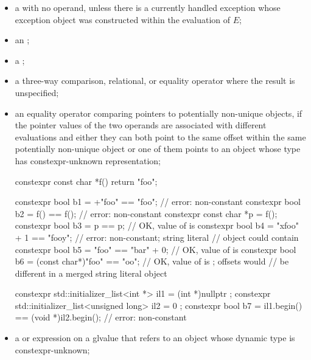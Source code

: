 \begin{itemize}
\item
a  with no operand,
unless there is a currently handled exception
whose exception object was constructed within the evaluation of $E$;

\item
an ;

\item
a ;

\item
a three-way comparison,
relational, or equality
operator where the result is unspecified;

\item
an equality operator comparing pointers to potentially non-unique objects,
if the pointer values of the two operands
are associated with different evaluations and either
they can both point to the same offset within
the same potentially non-unique object or
one of them points to an object whose
type has constexpr-unknown representation;
\begin{example}
\begin{codeblock}
constexpr const char *f() { return "foo"; }

constexpr bool b1 = +"foo" == "foo";                // error: non-constant
constexpr bool b2 = f() == f();                     // error: non-constant
constexpr const char *p = f();
constexpr bool b3 = p == p;                         // OK, value of  is 
constexpr bool b4 = "xfoo" + 1 == "foo\0y";         // error: non-constant; string literal
                                                    // object could contain 
constexpr bool b5 = "foo" == "bar" + 0;             // OK, value of  is 
constexpr bool b6 = (const char*)"foo" == "oo";     // OK, value of  is ; offsets would
                                                    // be different in a merged string literal object

constexpr std::initializer_list<int *> il1 = { (int *)nullptr };
constexpr std::initializer_list<unsigned long> il2 = { 0 };
constexpr bool b7 = il1.begin() == (void *)il2.begin();     // error: non-constant
\end{codeblock}
\end{example}

\item
a  or
 expression
on a glvalue that refers to an object
whose dynamic type is constexpr-unknown;


\end{itemize}
